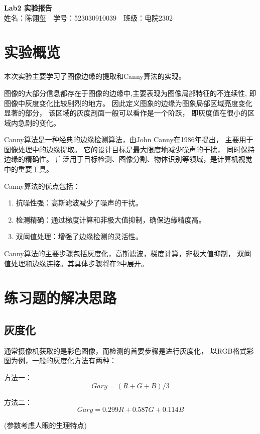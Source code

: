 \documentclass{article}
\begin{document}
\begin{center}
    \Large \textbf{Lab2 实验报告}\\
    \vspace{1em}
    姓名：陈翎玺~~学号：523030910039~~班级：电院2302
\end{center}

\section{实验概览}
    本次实验主要学习了图像边缘的提取和Canny算法的实现。


    图像的大部分信息都存在于图像的边缘中,主要表现为图像局部特征的不连续性,
    即图像中灰度变化比较剧烈的地方。
    因此定义图象的边缘为图象局部区域亮度变化显著的部分，
    该区域的灰度剖面一般可以看作是一个阶跃，
    即灰度值在很小的区域内急剧的变化。


    Canny算法是一种经典的边缘检测算法，由John Canny在1986年提出，
    主要用于图像处理中的边缘提取。
    它的设计目标是最大限度地减少噪声的干扰，
    同时保持边缘的精确性。
    广泛用于目标检测、图像分割、物体识别等领域，是计算机视觉中的重要工具。

    Canny算法的优点包括：
\begin{enumerate}
\item 抗噪性强：高斯滤波减少了噪声的干扰。
\item 检测精确：通过梯度计算和非极大值抑制，确保边缘精度高。
\item 双阈值处理：增强了边缘检测的灵活性。
\end{enumerate}

    Canny算法的主要步骤包括灰度化，高斯滤波，梯度计算，非极大值抑制，
    双阈值处理和边缘连接。其具体步骤将在\ref{section2}中展开。

\section{练习题的解决思路}\label{section2}
\subsection{灰度化}

    通常摄像机获取的是彩色图像，而检测的首要步骤是进行灰度化，
    以RGB格式彩图为例，一般的灰度化方法有两种：

    方法一：
    \[Gary = (R + G + B) / 3\]

\newpage

    方法二：
    \[Gary = 0.299R + 0.587G + 0.114B\]
\begin{center}
(参数考虑人眼的生理特点)
\end{center}
\end{document}
